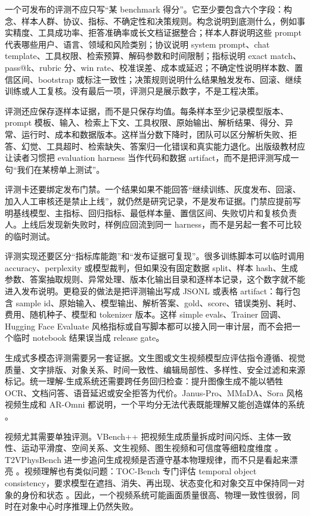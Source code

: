 \documentclass[UTF8,zihao=-4,openany]{ctexbook}
\begin{document}
一个可发布的评测不应只写“某 benchmark 得分”。它至少要包含六个字段：构念、样本人群、协议、指标、不确定性和决策规则。构念说明到底测什么，例如事实精度、工具成功率、拒答准确率或长文档证据整合；样本人群说明这些 prompt 代表哪些用户、语言、领域和风险类别；协议说明 system prompt、chat template、工具权限、检索预算、解码参数和时间限制；指标说明 exact match、pass@k、rubric 分、win rate、校准误差、成本或延迟；不确定性说明样本数、置信区间、bootstrap 或标注一致性；决策规则说明什么结果触发发布、回滚、继续训练或人工复核。没有最后一项，评测只是展示数字，不是工程决策。

评测还应保存逐样本证据，而不是只保存均值。每条样本至少记录模型版本、prompt 模板、输入、检索上下文、工具权限、原始输出、解析结果、得分、异常、运行时、成本和数据版本。这样当分数下降时，团队可以区分解析失败、拒答、幻觉、工具超时、检索缺失、答案归一化错误和真实能力退化。出版级教材应让读者习惯把 evaluation harness 当作代码和数据 artifact，而不是把评测写成一句“我们在某榜单上测试”。

评测卡还要绑定发布门禁。一个结果如果不能回答“继续训练、灰度发布、回滚、加入人工审核还是禁止上线”，就仍然是研究记录，不是发布证据。门禁应提前写明基线模型、主指标、回归指标、最低样本量、置信区间、失败切片和复核负责人。上线后发现新失败时，样例应回流到同一 harness，而不是另起一套不可比较的临时测试。

评测实现还要区分“指标库能跑”和“发布证据可复现”。很多训练脚本可以临时调用 accuracy、perplexity 或模型裁判，但如果没有固定数据 split、样本 hash、生成参数、答案抽取规则、异常处理、版本化输出目录和逐样本记录，这个数字就不能进入发布说明。更稳妥的做法是把评测输出写成 JSONL 或表格 artifact：每行包含 sample id、原始输入、模型输出、解析答案、gold、score、错误类别、耗时、费用、随机种子、模型和 tokenizer 版本。这样 simple evals、Trainer 回调、Hugging Face Evaluate 风格指标或自写脚本都可以接入同一审计层，而不会把一个临时 notebook 结果误当成 release gate。

生成式多模态评测需要另一套证据。文生图或文生视频模型应评估指令遵循、视觉质量、文字排版、对象关系、时间一致性、编辑局部性、多样性、安全过滤和来源标记。统一理解-生成系统还需要跨任务回归检查：提升图像生成不能以牺牲 OCR、文档问答、语音延迟或安全拒答为代价。Janus-Pro、MMaDA、Sora 风格视频生成和 AR-Omni 都说明，一个平均分无法代表既能理解又能创造媒体的系统 \cite{chen2025januspro,yang2025mmada,openai2024sora,cheng2026aromni}。

视频尤其需要单独评测。VBench++ 把视频生成质量拆成时间闪烁、主体一致性、运动平滑度、空间关系、文生视频、图生视频和可信度等细粒度维度 \cite{huang2024vbenchpp}。 T2VPhysBench 进一步追问生成视频是否遵守基本物理规律，而不只是看起来漂亮 \cite{guo2025t2vphysbench}。视频理解也有类似问题：TOC-Bench 专门评估 temporal object consistency，要求模型在遮挡、消失、再出现、状态变化和对象交互中保持同一对象的身份和状态 \cite{chen2026tocbench}。因此，一个视频系统可能画面质量很高、物理一致性很弱，同时在对象中心时序推理上仍然失败。
\end{document}
